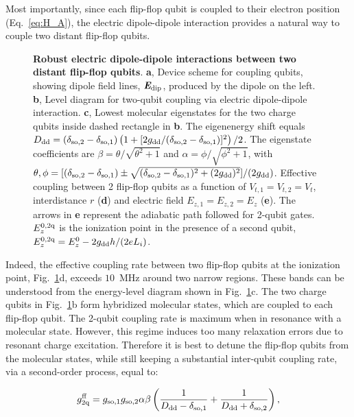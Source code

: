 \documentclass[aps,prb,superscriptaddress,nobibnotes,twocolumn]{revtex4-1}
\begin{document}
Most importantly, since each flip-flop qubit is coupled to their electron position (Eq.~\ref{eq:H_A}), the electric dipole-dipole interaction provides a natural way to couple two distant flip-flop qubits.


\begin{figure}
	\centering
	\caption{\textbf{Robust electric dipole-dipole interactions between two distant flip-flop qubits}.
		\textbf{a}, Device scheme for coupling qubits, showing dipole field lines, $\textit{\textbf{E}}_{\rm dip}$, produced by the dipole on the left.
		\textbf{b}, Level diagram for two-qubit coupling via electric dipole-dipole interaction.
		\textbf{c}, Lowest molecular eigenstates for the two charge qubits inside dashed rectangle in \textbf{b}. The eigenenergy shift equals $D_{\rm dd}=(\delta_{\rm so,2}-\delta_{\rm so,1})\left(1+[2g_{\rm dd}/(\delta_{\rm so,2}-\delta_{\rm so,1})]^2\right)/2$. The eigenstate coefficients are $\beta=\theta/\sqrt{\theta^2+1}$ and $\alpha=\phi/\sqrt{\phi^2+1}$, with $\theta,\phi=[(\delta_{\rm so,2}-\delta_{\rm so,1})\pm\sqrt{(\delta_{\rm so,2}-\delta_{\rm so,1})^2+(2g_{\rm dd})^2}]/(2g_{\rm dd})$.
		Effective coupling between 2 flip-flop qubits as a function of $V_{t,1}=V_{t,2}=V_t$, interdistance $r$ (\textbf{d}) and electric field $E_{z,1}=E_{z,2}=E_z$ (\textbf{e}). The arrows in \textbf{e} represent the adiabatic path followed for 2-qubit gates. $E_z^{\rm 0,2q}$ is the ionization point in the presence of a second qubit, $E_z^{\rm 0,2q}=E_z^0-2g_{\rm dd}h/(2eL_i)$.}
	\label{fig:2-qubit}
\end{figure}


Indeed, the effective coupling rate between two flip-flop qubits at the ionization point, Fig.~\ref{fig:2-qubit}d, exceeds $10$~MHz around two narrow regions. These bands can be understood from the energy-level diagram shown in Fig.~\ref{fig:2-qubit}c. The two charge qubits in Fig.~\ref{fig:2-qubit}b form hybridized molecular states, which are coupled to each flip-flop qubit. The 2-qubit coupling rate is maximum when in resonance with a molecular state. However, this regime induces too many relaxation errors due to resonant charge excitation. Therefore it is best to detune the flip-flop qubits from the molecular states, while still keeping a substantial inter-qubit coupling rate, via a second-order process, equal to:

\begin{equation}\label{eq:flipdipSWAP_Delta}
g_{\rm 2q}^{\rm ff}=g_{\rm so,1}g_{\rm so,2}\alpha\beta\left(\frac{1}{D_{\rm dd}-\delta_{\rm so,1}}+\frac{1}{D_{\rm dd}+\delta_{\rm so,2}}\right),
\end{equation}
\end{document}
